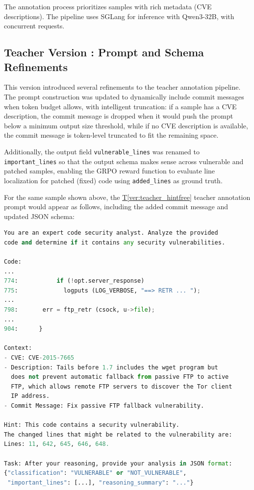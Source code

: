 \documentclass[12pt,a4paper]{article}
\makeatletter
\newcounter{TeacherVer}
\newcommand{\teacherversion}[2]{%
  \stepcounter{TeacherVer}%
  \subsection{Teacher Version \theTeacherVer: #1}%
  \protected@edef\@currentlabel{\theTeacherVer}\label{#2}%
}
\makeatother
\begin{document}
The annotation process prioritizes samples with rich metadata (CVE descriptions). The pipeline uses SGLang \cite{sglang} for inference with Qwen3-32B, with concurrent requests.

\teacherversion{Prompt and Schema Refinements}{ver:teacher_hintfree}
This version introduced several refinements to the teacher annotation pipeline. The prompt construction was updated to dynamically include commit messages when token budget allows, with intelligent truncation: if a sample has a CVE description, the commit message is dropped when it would push the prompt below a minimum output size threshold, while if no CVE description is available, the commit message is token-level truncated to fit the remaining space.

Additionally, the output field \texttt{vulnerable\_lines} was renamed to \texttt{important\_lines} so that the output schema makes sense across vulnerable and patched samples, enabling the GRPO reward function to evaluate line localization for patched (fixed) code using \texttt{added\_lines} as ground truth.

For the same sample shown above, the \hyperref[ver:teacher_hintfree]{T\ref*{ver:teacher_hintfree}} teacher annotation prompt would appear as follows, including the added commit message and updated JSON schema:

\begin{lstlisting}[language=Python, caption={Example T\ref*{ver:teacher_hintfree} teacher annotation prompt}]
You are an expert code security analyst. Analyze the provided 
code and determine if it contains any security vulnerabilities.

Code:
...
774:           if (!opt.server_response)
775:             logputs (LOG_VERBOSE, "==> RETR ... ");
...
798:       err = ftp_retr (csock, u->file);
...
904:      }

Context:
- CVE: CVE-2015-7665
- Description: Tails before 1.7 includes the wget program but 
  does not prevent automatic fallback from passive FTP to active 
  FTP, which allows remote FTP servers to discover the Tor client 
  IP address.
- Commit Message: Fix passive FTP fallback vulnerability.

Hint: This code contains a security vulnerability.
The changed lines that might be related to the vulnerability are: 
Lines: 11, 642, 645, 646, 648.

Task: After your reasoning, provide your analysis in JSON format: 
{"classification": "VULNERABLE" or "NOT_VULNERABLE", 
 "important_lines": [...], "reasoning_summary": "..."}
\end{lstlisting}
\end{document}

